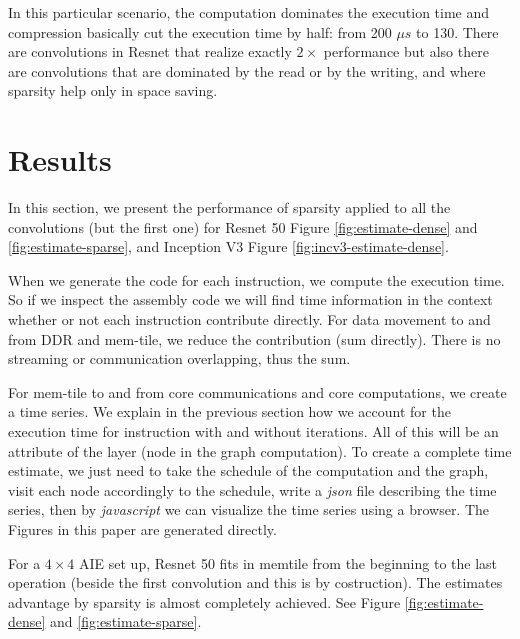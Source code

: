 \documentclass[conference]{IEEEtran}
\begin{document}
In this particular scenario, the computation dominates the execution
time and compression basically cut the execution time by half: from
200 $\mu s$ to 130. There are convolutions in Resnet that realize
exactly $2\times$ performance but also there are convolutions that are
dominated by the read or by the writing, and where sparsity help only
in space saving.


\section{Results}
\label{sec:experiments}
In this section, we present the performance of sparsity applied to all
the convolutions (but the first one) for Resnet 50 Figure
\ref{fig:estimate-dense} and \ref{fig:estimate-sparse}, and Inception
V3 Figure \ref{fig:incv3-estimate-dense}.


When we generate the code for each instruction, we compute the
execution time. So if we inspect the assembly code we will find time
information in the context whether or not each instruction contribute
directly. For data movement to and from DDR and mem-tile, we reduce
the contribution (sum directly). There is no streaming or
communication overlapping, thus the sum.

For mem-tile to and from core communications and core computations, we
create a time series. We explain in the previous section how we
account for the execution time for instruction with and without
iterations. All of this will be an attribute of the layer (node in the
graph computation).  To create a complete time estimate, we just need
to take the schedule of the computation and the graph, visit each node
accordingly to the schedule, write a {\em json} file describing the
time series, then by {\em javascript} we can visualize the time series
using a browser. The Figures in this paper are generated directly.

For a $4\times 4$ AIE set up, Resnet 50 fits in memtile from the
beginning to the last operation (beside the first convolution and this
is by costruction). The estimates advantage by sparsity is almost
completely achieved.  See Figure \ref{fig:estimate-dense} and
\ref{fig:estimate-sparse}.
\end{document}
